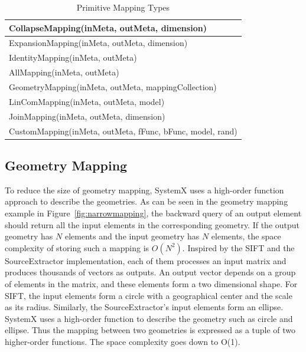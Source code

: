 \documentclass{sig-alternate}
\begin{document}
\begin{table}[t]
\begin{center}
    \caption{Primitive Mapping Types}
    \begin{scriptsize}
    \begin{tabular}{ | p{8cm}|}
    \hline
    CollapseMapping(inMeta, outMeta, dimension) \\ \hline 
    ExpansionMapping(inMeta, outMeta, dimension) \\ \hline
    IdentityMapping(inMeta, outMeta) \\ \hline
    AllMapping(inMeta, outMeta) \\ \hline
    GeometryMapping(inMeta, outMeta, mappingCollection) \\ \hline
    LinComMapping(inMeta, outMeta, model) \\ \hline
    JoinMapping(inMeta, outMeta, dimension) \\ \hline
    CustomMapping(inMeta, outMeta, fFunc, bFunc, model, rand) \\ \hline
    \end{tabular}
    \end{scriptsize}
    \label{tb:mapping-interface}
\end{center}   
\end{table}

\subsection{Geometry Mapping}
\label{sec:Design-GeometryMapping}
To reduce the size of geometry mapping, SystemX uses a high-order function approach to describe the geometries.
As can be seen in the geometry mapping example in Figure~\ref{fig:narrowmapping}, the backward query of an 
output element should return all the input elements in the corresponding geometry. If the output geometry has 
$N$ elements and the input geometry has $N$ elements, the space complexity of storing such a mapping is $O(N^2)$. 
Inspired by the SIFT and the SourceExtractor implementation, each of them processes an input matrix and produces 
thousands of vectors as outputs. An output vector depends on a group of elements in the matrix, and these elements 
form a two dimensional shape. 
For SIFT, the input elements form a circle with a geographical center and the scale as its radius.
Similarly, the SourceExtractor's input elements form an ellipse. 
SystemX uses a high-order function to describe the geometry such as circle and ellipse. 
Thus the mapping between two geometries is expressed as a tuple of two higher-order functions.
The space complexity goes down to O(1).
\end{document}
